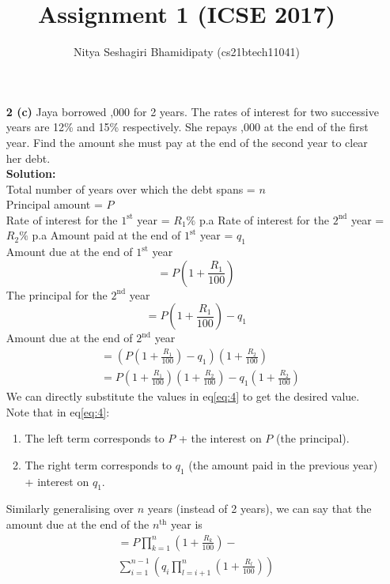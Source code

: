 \documentclass[journal,12pt,two column]{IEEEtran}
\title{Assignment 1 (ICSE 2017)}
\author{Nitya Seshagiri Bhamidipaty (cs21btech11041)}
\newcommand{\solution}{\noindent \textbf{Solution: }}
\begin{document}
\maketitle
\begin{enumerate}
\item[\textbf{2 (c)}] Jaya borrowed ,000 for 2 years. The rates of interest for two successive years are 12\% and 15\% respectively. She repays ,000 at the end of the first year. Find the amount she must pay at the end of the second year to clear her debt.\\
\solution \\
Total number of years over which the debt spans = $n$\\
Principal amount =  \rupee$P$\\
Rate of interest for the $1^{\text{st}}$ year =  $R_1\%$ p.a
Rate of interest for the $2^{\text{nd}}$ year =  $R_2\%$ p.a
Amount paid at the end of $1^{\text{st}}$ year = \rupee $q_1$\\ 
Amount due at the end of $1^{\text{st}}$ year
\begin{equation}
     = P\left(1+\frac{R_1}{100}\right)
\end{equation}
The principal for the $2^{\text{nd}}$ year
\begin{equation}
     = P\left(1+\frac{R_1}{100}\right) - q_1
\end{equation}
Amount due at the end of $2^{\text{nd}}$ year
\begin{align}
    &= \left (P\left(1+\frac{R_1}{100}\right) - q_1\right)\left(1 + \frac{R_2}{100}\right)
    \\
    &= P\left(1+\frac{R_1}{100}\right)\left(1+\frac{R_2}{100}\right) - q_1\left(1+\frac{R_2}{100}\right)\label{eq:4}
\end{align}
We can directly substitute the values in eq\eqref{eq:4} to get the desired value.\\
Note that in eq\eqref{eq:4}:
    \begin{enumerate}
        \item The left term corresponds to $P$ + the interest on $P$ (the principal).
        \item The right term corresponds to $q_1$ (the amount paid in the previous year) + interest on $q_1$.
\end{enumerate}
Similarly generalising over $n$ years (instead of 2 years), 
we can say that the amount due at the end of the $n^{\text{th}}$ year is 
\begin{multline}
 = P\prod_{k = 1}^{n}{\left(1+\frac{R_k}{100}\right)} -\\ \sum_{i=1}^{n-1}{\left(q_i\prod_{l=i+1}^{n}{\left(1+\frac{R_l}{100}\right)}\right)}

\end{multline}
\end{enumerate}
\end{document}
